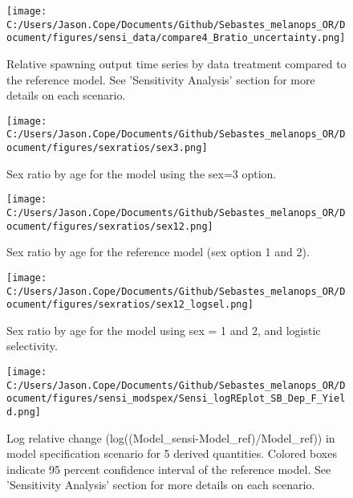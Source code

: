 \documentclass[11pt,
  letterpaper,
]{article}
\begin{document}
\newpage

\begin{figure}
{\centering
\texttt{[image: C:/Users/Jason.Cope/Documents/Github/Sebastes\_melanops\_OR/Document/figures/sensi\_data/compare4\_Bratio\_uncertainty.png]}
}
\caption{Relative spawning output time series by data treatment compared to the reference model. See 'Sensitivity Analysis' section for more details on each scenario.\label{fig:sensi-data-depl}}
\end{figure}

\newpage

\begin{figure}
{\centering
\texttt{[image: C:/Users/Jason.Cope/Documents/Github/Sebastes\_melanops\_OR/Document/figures/sexratios/sex3.png]}
}
\caption{Sex ratio by age for the model using the sex=3 option.\label{fig:sexratioSex3}}
\end{figure}

\newpage

\begin{figure}
{\centering
\texttt{[image: C:/Users/Jason.Cope/Documents/Github/Sebastes\_melanops\_OR/Document/figures/sexratios/sex12.png]}
}
\caption{Sex ratio by age for the reference model (sex option 1 and 2).\label{fig:sexratioSex12}}
\end{figure}

\newpage

\begin{figure}
{\centering
\texttt{[image: C:/Users/Jason.Cope/Documents/Github/Sebastes\_melanops\_OR/Document/figures/sexratios/sex12\_logsel.png]}
}
\caption{Sex ratio by age for the model using sex = 1 and 2, and logistic selectivity.\label{fig:sexratio12Log}}
\end{figure}

\newpage

\begin{figure}
{\centering
\texttt{[image: C:/Users/Jason.Cope/Documents/Github/Sebastes\_melanops\_OR/Document/figures/sensi\_modspex/Sensi\_logREplot\_SB\_Dep\_F\_Yield.png]}
}
\caption{Log relative change (log((Model\_sensi-Model\_ref)/Model\_ref)) in model specification scenario for 5 derived quantities. Colored boxes indicate 95 percent confidence interval of the reference model. See 'Sensitivity Analysis' section for more details on each scenario.\label{fig:sensi-modspec-RE}}
\end{figure}
\end{document}
